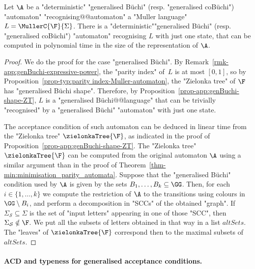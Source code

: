 \documentclass[10pt,a4paper]{amsart}
\renewcommand{\S}{\mathcal{S}}
\renewcommand{\SS}{\Sigma}
\begin{document}
\begin{corollary}
	Let $\A$ %
	be a "deterministic" "generalised Büchi" (resp. "generalised coB\"uchi") "automaton"  "recognising@@automaton" a "Muller language" $L = \MullerC{\F}{\SS}$. There is a "deterministic""generalised Büchi" (resp. "generalised coB\"uchi") "automaton" recognising $L$ with just one state, that can be computed in polynomial time in the size of the representation of $\A$.
\end{corollary}
\begin{proof}
	We do the proof for the case "generalised Büchi".
	By Remark~\ref{rmk-app:genBuchi-expressive-power}, the "parity index" of~$L$ is at most $[0,1]$, so by Proposition~\ref{prop-typ:parity index-Muller-automaton}, the "Zielonka tree" of $\F$ has "generalised B\"uchi shape". Therefore, by Proposition~\ref{prop-app:genBuchi-shape-ZT}, $L$ is a "generalised B\"uchi@@language" that can be trivially "recognised" by a "generalised B\"uchi" "automaton" with just one state.
	
	The acceptance condition of such automaton can be deduced in linear time from the "Zielonka tree" $\zielonkaTree{\F}$, as indicated in the proof of Proposition~\ref{prop-app:genBuchi-shape-ZT}. The "Zielonka tree" $\zielonkaTree{\F}$ can be computed from the original automaton $\A$ using a similar argument than in the proof of Theorem~\ref{thm-min:minimisation_parity_automata}. Suppose that the "generalised Büchi" condition used by $\A$ is given by the sets $B_1,\dots, B_k\subseteq \GG$. Then, for each $i\in \{1,\dots,k\}$ we compute the restriction of $\A$ to the transitions using colours in $\GG\setminus B_i$, and perform a decomposition in "SCCs" of the obtained "graph". If $\SS_\S\subseteq \SS$ is the set of "input letters" appearing in one of those "SCC", then $\SS_\S\notin \F$. We put all the subsets of letters obtained in that way in a list $\mathit{altSets}$. The "leaves" of $\zielonkaTree{\F}$ correspond then to the maximal subsets of $\mathit{altSets}$.	
\end{proof}

\paragraph*{ACD and typeness for generalised acceptance conditions.}
\end{document}

